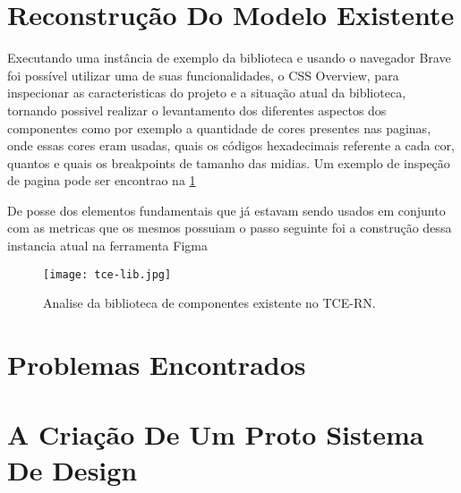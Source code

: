 \section{Reconstrução Do Modelo Existente} \label{secao31}

  Executando uma instância de exemplo da biblioteca e usando o navegador Brave foi possível utilizar uma de suas funcionalidades, o CSS Overview, para inspecionar as caracteristicas do projeto e a situação atual da biblioteca, tornando possivel realizar o levantamento dos diferentes aspectos dos componentes como por exemplo a quantidade de cores presentes nas paginas, onde essas cores eram usadas, quais os códigos hexadecimais referente a cada cor, quantos e quais os breakpoints de tamanho das midias. Um exemplo de inspeção de pagina pode ser encontrao na \ref{fig:tcenglib}

  De posse dos elementos fundamentais que já estavam sendo usados em conjunto com as metricas que os mesmos possuiam o passo seguinte foi a construção dessa instancia atual na ferramenta Figma

  \begin{figure}
    \texttt{[image: tce-lib.jpg]}
    \caption{Analise da biblioteca de componentes existente no TCE-RN.}
    \label{fig:tcenglib}
  \end{figure}

\section{Problemas Encontrados} \label{secao32}

\section{A Criação De Um Proto Sistema De Design} \label{secao33}


